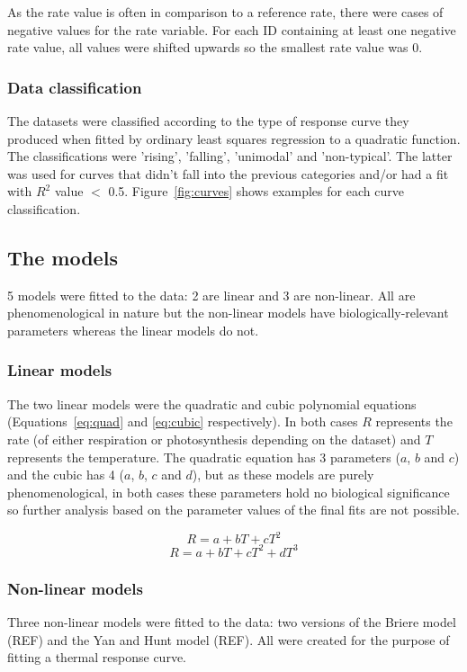 \documentclass[11pt]{article}
\begin{document}
	As the rate value is often in comparison to a reference rate, there were cases of negative values for the rate variable. For each ID containing at least one negative rate value, all values were shifted upwards so the smallest rate value was 0.
	
	\subsubsection*{Data classification}
	The datasets were classified according to the type of response curve they produced when fitted by ordinary least squares regression to a quadratic function. The classifications were 'rising', 'falling', 'unimodal' and 'non-typical'. The latter was used for curves that didn't fall into the previous categories and/or had a fit with $R^2$ value $<$ 0.5. Figure~\ref{fig:curves} shows examples for each curve classification.
	
	\subsection{The models}
	5 models were fitted to the data: 2 are linear and 3 are non-linear. All are phenomenological in nature but the non-linear models have biologically-relevant parameters whereas the linear models do not. 
	
	\subsubsection*{Linear models}	
	The two linear models were the quadratic and cubic polynomial equations (Equations~\ref{eq:quad} and \ref{eq:cubic} respectively). In both cases $R$ represents the rate (of either respiration or photosynthesis depending on the dataset) and $T$ represents the temperature. The quadratic equation has 3 parameters ($a$, $b$ and $c$) and the cubic has 4 ($a$, $b$, $c$ and $d$), but as these models are purely phenomenological, in both cases these parameters hold no biological significance so further analysis based on the parameter values of the final fits are not possible.
	
	\begin{equation} \label{eq:quad}
	R = a + bT + cT^2
	\end{equation}
	\begin{equation} \label{eq:cubic}
	R = a + bT + cT^2 + dT^3
	\end{equation}
	
	\subsubsection*{Non-linear models}
	Three non-linear models were fitted to the data: two versions of the Briere model (REF) and the Yan and Hunt model (REF). All were created for the purpose of fitting a thermal response curve.
	
\end{document}
